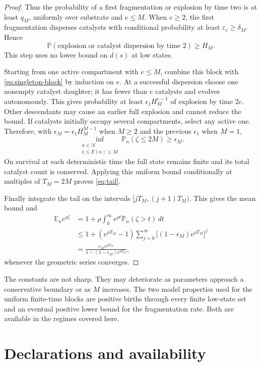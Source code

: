 \documentclass[11pt,a4paper]{article}
\theoremstyle{remark}\newtheorem{remark}[theorem]{Remark}
\newcommand{\E}{\mathbb E}
\newcommand{\Prob}{\mathbb P}
\newcommand{\state}{\mathcal N}
\begin{document}
\begin{proof}
Thus the probability of a first fragmentation or explosion by time two is at least $q_M$, uniformly over substrate and $e\le M$. When $e\ge2$, the first fragmentation disperses catalysts with conditional probability at least $\varepsilon_e\ge\delta_M$. Hence
\[
\Prob(\text{explosion or catalyst dispersion by time }2)\ge H_M.
\]
This step uses no lower bound on $d(s)$ at low states.

Starting from one active compartment with $e\le M$, combine this block with \eqref{eq:singleton-block} by induction on $e$. At a successful dispersion choose one nonempty catalyst daughter; it has fewer than $e$ catalysts and evolves autonomously. This gives probability at least
$\epsilon_1H_M^{e-1}$ of explosion by time $2e$.
Other descendants may cause an earlier full explosion and cannot reduce the bound. If catalysts initially occupy several compartments, select any active one. Therefore, with
$\epsilon_M=\epsilon_1H_M^{M-1}$ when $M\ge2$ and the previous $\epsilon_1$ when $M=1$,
\[
\inf_{\substack{n\in\state\\1\le E(n)\le M}}
\Prob_n(\zeta\le2M)\ge\epsilon_M.
\]
On survival at each deterministic time the full state remains finite and its total catalyst count is conserved. Applying this uniform bound conditionally at multiples of $T_M=2M$ proves \eqref{eq:tail}.

Finally integrate the tail on the intervals $[jT_M,(j+1)T_M)$. This gives the mean bound and
\begin{align*}
\E_n e^{\rho\zeta}
&=1+\rho\int_0^\infty e^{\rho t}\Prob_n(\zeta>t)\,dt\\
&\le1+(e^{\rho T_M}-1)
 \sum_{j=0}^\infty\bigl[(1-\epsilon_M)e^{\rho T_M}\bigr]^j\\
&=\frac{\epsilon_M e^{\rho T_M}}
 {1-(1-\epsilon_M)e^{\rho T_M}},
\end{align*}
whenever the geometric series converges.
\end{proof}

The constants are not sharp. They may deteriorate as parameters approach a conservative boundary or as $M$ increases. The two model properties used for the uniform finite-time blocks are positive births through every finite low-state set and an eventual positive lower bound for the fragmentation rate. Both are available in the regimes covered here.


\section*{Declarations and availability}
\end{document}
